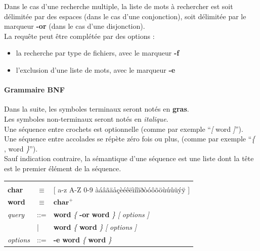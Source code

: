 \documentclass[a4paper,10pt]{article}
\begin{document}
Dans le cas d'une recherche multiple, la liste de mots à rechercher est soit délimitée par 
des espaces (dans le cas d'une conjonction), soit délimitée par le marqueur \textbf{-or} (dans le
cas d'une disjonction).\\

La requête peut être complétée par des options :
\begin{itemize}
 \item la recherche par type de fichiers, avec le marqueur \textbf{-f}
 \item l'exclusion d'une liste de mots, avec le marqueur \textbf{-e}
 \end{itemize}

\paragraph{Grammaire BNF\\}
Dans la suite, les symboles terminaux seront notés en \textbf{gras}.\\
Les symboles non-terminaux seront notés en \textit{italique}.\\
Une séquence entre crochets est optionnelle (comme par exemple ``\textit{[} word \textit{]}'').\\
Une séquence entre accolades se répète zéro fois ou plus, (comme par exemple ``\textit{\{} , word \textit{\}}'').\\
Sauf indication contraire, la sémantique d’une séquence est une liste dont la tête est le premier élément de la séquence.\\

\begin{tabular}{p{1.5cm} p{0.5cm} p{9cm} }
& & \\
\textbf{char} & $\equiv$ & [ a-z A-Z 0-9 àáâãäåçèéêëìíîïðòóôõöùúûüýÿ ]\\
\textbf{word} & $\equiv$ & $\textbf{char}^+$\\
\textit{query} & ::= & \textbf{word} \textit{\{} \textbf{-or} \textbf{word} \textit{\}} \textit{[} \textit{options} \textit{]}\\
& | & \textbf{word} \textit{\{} \textbf{word} \textit{\}} \textit{[} \textit{options} \textit{]}\\
\textit{options} & ::= & \textbf{-e} \textbf{word} \textit{\{} \textbf{word} \textit{\}}\\
\end{tabular}


\end{document}
